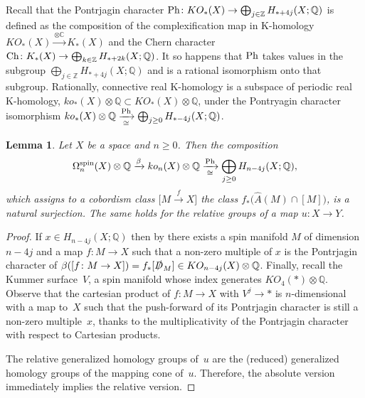 \documentclass[pdftex]{sigma}
\numberwithin{equation}{section}
\newtheorem{Lemma}[Theorem]{Lemma}
\def\CC{\ensuremath{\mathbb{C}}}
\def\QQ{\ensuremath{\mathbb{Q}}}
\def\ZZ{\ensuremath{\mathbb{Z}}}
\newcommand{\rationals}{\mathbb{Q}}
\newcommand{\tensor}{\otimes}
\newcommand{\iso}{\cong}
\DeclareMathOperator{\spin}{spin}
\begin{document}
Recall that the Pontrjagin character
$
{\rm Ph}\colon KO_*(X)\to \bigoplus_{j\in \ZZ}H_{*+4j}(X;\QQ)
$
is defined as the composition of the complexification map in K-homology
$KO_*(X)\xrightarrow{\otimes\CC}K_*(X)$ and the Chern character ${\rm Ch}\colon
K_*(X)\to \bigoplus_{k\in \ZZ}H_{*+2k}(X;\QQ)$. It so happens that ${\rm Ph}$
takes values in the subgroup $\bigoplus_{j\in\ZZ} H_{*+4j}(X;\QQ)$
and is a rational isomorphism onto that subgroup. Rationally, connective
real K-homology is a subspace of periodic real K-homology,
$ko_*(X)\tensor\rationals\subset KO_*(X)\tensor\rationals$, under the
Pontryagin character isomorphism
$ko_*(X)\tensor\rationals\xrightarrow[\iso]{{\rm Ph}}
\bigoplus_{j\ge 0} H_{*-4j}(X;\rationals)$.

\begin{Lemma}\label{pontrjagin-surjective}
 Let $X$ be a space and $n\geq0$. Then
 the composition
 \begin{equation*}%
 \Omega^{\spin}_{n}(X)\otimes\QQ \xrightarrow{\beta}
 ko_{n}(X)\otimes\QQ \xrightarrow[\cong]{{\rm Ph}} \bigoplus_{j\geq0}H_{n-4j}(X;\QQ),\end{equation*}
 which assigns to a cobordism class $\big[M\xrightarrow{f}X\big]$ the class $f_*\big(\hat{A}(M)\cap [M]\big)$,
 is a natural surjection. The same holds for the relative groups
 of a map $u\colon X\to Y$.
\end{Lemma}
\begin{proof}
 If $x\in H_{n-4j}(X;\QQ)$ then by \cite[Proposition~3.1]{XieYuZeidler} there
 exists a spin manifold $M$ of dimension $n-4j$ and a map $f\colon M\to X$
 such that a non-zero multiple of $x$ is the Pontrjagin character of
 $\beta([f\colon M\to X]) =f_*[\slashed{D}_M]\in
 KO_{n-4j}(X)\otimes\QQ$. Finally, recall the Kummer surface~$V$, a spin manifold whose index generates $KO_4(*)\otimes \QQ$.
 Observe that the cartesian product of $f\colon M\to
 X$ with $V^j\to *$ is $n$-dimensional with a map to~$X$ such
 that the push-forward of its Pontrjagin character is still a non-zero
 multiple~$x$, thanks to
 the multiplicativity of the Pontrjagin character with respect to Cartesian products.

 The relative generalized homology groups of~$u$ are the (reduced) generalized
 homology groups of the mapping cone of~$u$. Therefore, the
 absolute version immediately implies the relative version.
\end{proof}
\end{document}
